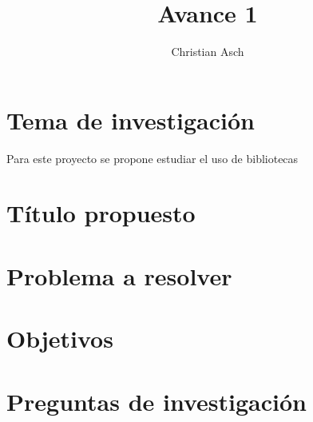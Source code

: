 \documentclass{article}
\begin{document}
\title{Avance 1}
\author{Christian Asch}
\date{}
\maketitle

\section{Tema de investigación}
Para este proyecto se propone estudiar el uso de bibliotecas \cite{childs_terminology_2020}
\section{Título propuesto}
\section{Problema a resolver}
\section{Objetivos}
\section{Preguntas de investigación}

\printbibliography
\end{document}
